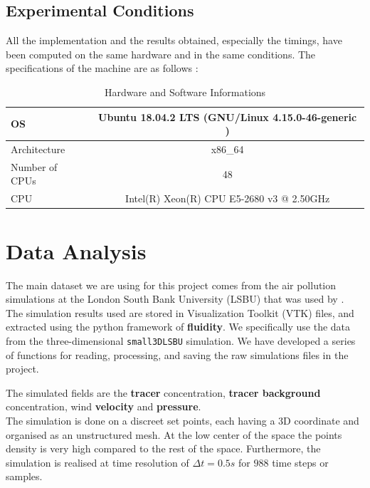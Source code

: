 
\subsection{Experimental Conditions}

All the implementation and the results obtained, especially the timings, have been computed on the same hardware and in the same conditions. The specifications of the machine are as follows :

\begin{table}[h!]
\centering
\begin{tabular}{l|c}
\hline

OS & Ubuntu 18.04.2 LTS (GNU/Linux 4.15.0-46-generic ) \\ \hline
Architecture    &    x86\_64 \\ \hline

Number of CPUs          &    48\\ \hline

CPU     &    Intel(R) Xeon(R) CPU E5-2680 v3 @ 2.50GHz \\ \hline

\end{tabular}
\caption{Hardware and Software Informations}
\end{table}



\section{Data Analysis}
The main dataset we are using for this project comes from the air pollution simulations at the London South Bank University (LSBU) that was used by \citet{arcucci_optimal_2019}.\\ 


The simulation results used are stored in Visualization Toolkit (VTK) files, and extracted using the python framework of \textbf{fluidity}. We specifically use the data from the three-dimensional \texttt{small3DLSBU} simulation. We have developed a series of functions for reading, processing, and saving the raw simulations files in the project. 

The simulated fields are the \textbf{tracer} concentration, \textbf{tracer background} concentration, wind \textbf{velocity} and \textbf{pressure}. \\


The simulation is done on a discreet set points, each having a 3D coordinate and organised as an unstructured mesh. At the low center of the space the points density is very high compared to the rest of the space. Furthermore, the simulation is realised at time resolution of $\Delta t = 0.5s$ for $988$ time steps or samples. \\
 
